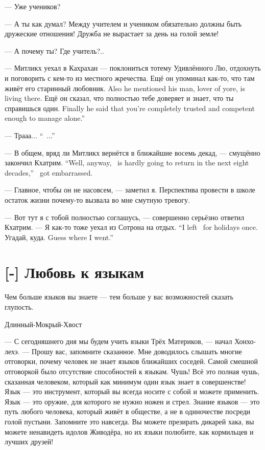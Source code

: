 --- Уже учеников?

--- А ты как думал?
Между учителем и учеником обязательно должны быть дружеские отношения!
Дружба не вырастает за день на голой земле!

--- А почему ты?
Где учитель?..

--- Митликх уехал в Кахрахан --- поклониться тотему Удивлённого Лю, отдохнуть и поговорить с кем-то из местного жречества.
{Ещё он упоминал как-то, что там живёт его старинный любовник.}
{Also he mentioned his man, lover of yore, is living there.}
{Ещё он сказал, что полностью тебе доверяет и знает, что ты справишься один.}
{Finally he said that you're completely trusted and competent enough to manage alone.''}

{--- Трааа...}
{``\Traa\ ...''}

{--- В общем, вряд ли Митликх вернётся в ближайшие восемь декад, --- смущённо закончил Кхатрим.}
{``Well, anyway, \Mitlikch\ is hardly going to return in the next eight decades,'' \Kchatrim\ got embarrassed.}

--- Главное, чтобы он не насовсем, --- заметил я.
Перспектива провести в школе остаток жизни почему-то вызвала во мне смутную тревогу.

--- Вот тут я с тобой полностью соглашусь, --- совершенно серьёзно ответил Кхатрим.
{--- Я как-то тоже уехал из Сотрона на отдых.}
{``I left \Sotron\ for holidays once.}
{Угадай, куда.}
{Guess where I went.''}


\section{[-] Любовь к языкам}

\epigraph
{Чем больше языков вы знаете --- тем больше у вас возможностей сказать глупость.}
{Длинный-Мокрый-Хвост}

\textspace

--- С сегодняшнего дня мы будем учить языки Трёх Материков, --- начал Хонхо-лехэ.
--- Прошу вас, запомните сказанное.
Мне доводилось слышать многие отговорки, почему человек не знает языков ближайших соседей.
Самой смешной отговоркой было отсутствие способностей к языкам.
Чушь!
Всё это полная чушь, сказанная человеком, который как минимум один язык знает в совершенстве!
Язык --- это инструмент, который вы всегда носите с собой и можете применить.
Язык --- это оружие, для которого не нужно ножен и стрел.
Знание языков --- это путь любого человека, который живёт в обществе, а не в одиночестве посреди голой пустыни.
Запомните это навсегда.
Вы можете презирать дикарей хака, вы можете ненавидеть идолов Живодёра, но их языки полюбите, как кормильцев и лучших друзей!

